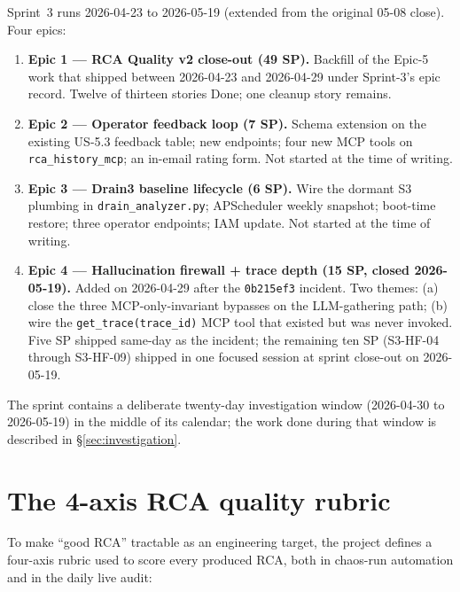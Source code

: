 \documentclass[11pt,a4paper,oneside]{report}
\begin{document}
Sprint~3 runs 2026-04-23 to 2026-05-19 (extended from the original
05-08 close).  Four epics:

\begin{enumerate}
  \item \textbf{Epic 1 --- RCA Quality v2 close-out (49 SP).}
        Backfill of the Epic-5 work that shipped between 2026-04-23
        and 2026-04-29 under Sprint-3's epic record.  Twelve of
        thirteen stories Done; one cleanup story remains.
  \item \textbf{Epic 2 --- Operator feedback loop (7 SP).}  Schema
        extension on the existing US-5.3 feedback table; new
        endpoints; four new MCP tools on \texttt{rca\_history\_mcp};
        an in-email rating form.  Not started at the time of writing.
  \item \textbf{Epic 3 --- Drain3 baseline lifecycle (6 SP).}  Wire
        the dormant S3 plumbing in \texttt{drain\_analyzer.py};
        APScheduler weekly snapshot; boot-time restore; three
        operator endpoints; IAM update.  Not started at the time of
        writing.
  \item \textbf{Epic 4 --- Hallucination firewall + trace depth
        (15 SP, closed 2026-05-19).}  Added on 2026-04-29 after the
        \texttt{0b215ef3} incident.  Two themes: (a) close the three
        MCP-only-invariant bypasses on the LLM-gathering path; (b)
        wire the \texttt{get\_trace(trace\_id)} MCP tool that
        existed but was never invoked.  Five SP shipped same-day as
        the incident; the remaining ten SP (S3-HF-04 through
        S3-HF-09) shipped in one focused session at sprint close-out
        on 2026-05-19.
\end{enumerate}

The sprint contains a deliberate twenty-day investigation window
(2026-04-30 to 2026-05-19) in the middle of its calendar; the work
done during that window is described in \S\ref{sec:investigation}.

\section{The 4-axis RCA quality rubric}

To make ``good RCA'' tractable as an engineering target, the project
defines a four-axis rubric used to score every produced RCA, both in
chaos-run automation and in the daily live audit:
\end{document}
